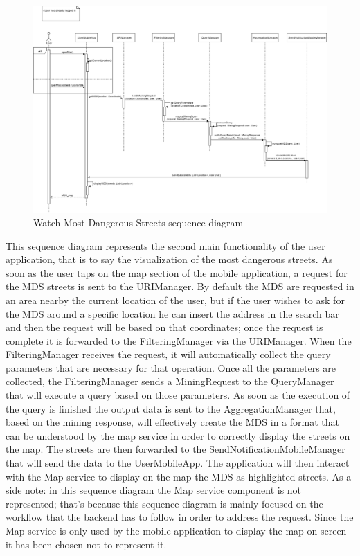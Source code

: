 \begin{figure}[H]
  \centering
  \includegraphics[width=1\textwidth]{Images/UML_diagrams/Sequence_Diagrams/Request_MDS_sd.png}
  \caption{Watch Most Dangerous Streets sequence diagram}
  \label{fig:watch_MDS_sd}
\end{figure}
This sequence diagram represents the second main functionality of the user application, that is to say the visualization of the most dangerous streets. As soon as the user taps on the map section of the mobile application, a request for the MDS streets is sent to the URIManager. By default the MDS are requested in an area nearby the current location of the user, but if the user wishes to ask for the MDS around a specific location he can insert the address in the search bar and then the request will be based on that coordinates; once the request is complete it is forwarded to the FilteringManager via the URIManager. When the FilteringManager receives the request, it will automatically collect the query parameters that are necessary for that operation.  Once all the parameters are collected, the FilteringManager sends a MiningRequest to the QueryManager that will execute a query based on those parameters. As soon as the execution of the query is finished the output data is sent to the AggregationManager that, based on the mining response, will effectively create the MDS in a format that can be understood by the map service in order to correctly display the streets on the map. The streets are then forwarded to the SendNotificationMobileManager that will send the data to the UserMobileApp. The application will then interact with the Map service to display on the map the MDS as highlighted streets. As a side note: in this sequence diagram the Map service component is not represented; that's because this sequence diagram is mainly focused on the workflow that the backend has to follow in order to address the request. Since the Map service is only used by the mobile application to display the map on screen it has been chosen not to represent it.
